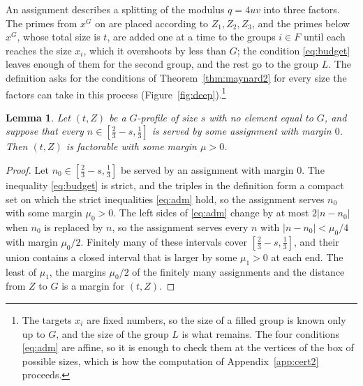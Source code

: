 \documentclass[aps,prd,twocolumn,superscriptaddress,nofootinbib,longbibliography,floatfix,showkeys,nobalancelastpage,amsmath,amssymb,10pt]{revtex4-2}
\theoremstyle{plain}
\newtheorem{lemma}[theorem]{Lemma}
\theoremstyle{definition}
\theoremstyle{plain}
\begin{document}
An assignment describes a splitting of the modulus $q=4uv$ into three factors. The primes from $x^G$ on are placed according to $Z_1,Z_2,Z_3$, and the primes below $x^G$, whose total size is $t$, are added one at a time to the groups $i\in F$ until each reaches the size $x_i$, which it overshoots by less than $G$; the condition \eqref{eq:budget} leaves enough of them for the second group, and the rest go to the group $L$. The definition asks for the conditions of Theorem~\ref{thm:maynard2} for every size the factors can take in this process (Figure~\ref{fig:deep}).\footnote{The targets $x_i$ are fixed numbers, so the size of a filled group is known only up to $G$, and the size of the group $L$ is what remains. The four conditions \eqref{eq:adm} are affine, so it is enough to check them at the vertices of the box of possible sizes, which is how the computation of Appendix~\ref{app:cert2} proceeds.}

\begin{lemma}\label{lem:margin}
Let $(t,Z)$ be a $G$-profile of size $s$ with no element equal to $G$, and suppose that every $n\in[\frac23-s,\frac13]$ is served by some assignment with margin $0$. Then $(t,Z)$ is factorable with some margin $\mu>0$.
\end{lemma}

\begin{proof}
Let $n_0\in[\frac23-s,\frac13]$ be served by an assignment with margin $0$. The inequality \eqref{eq:budget} is strict, and the triples in the definition form a compact set on which the strict inequalities \eqref{eq:adm} hold, so the assignment serves $n_0$ with some margin $\mu_0>0$. The left sides of \eqref{eq:adm} change by at most $2|n-n_0|$ when $n_0$ is replaced by $n$, so the assignment serves every $n$ with $|n-n_0|<\mu_0/4$ with margin $\mu_0/2$. Finitely many of these intervals cover $[\frac23-s,\frac13]$, and their union contains a closed interval that is larger by some $\mu_1>0$ at each end. The least of $\mu_1$, the margins $\mu_0/2$ of the finitely many assignments and the distance from $Z$ to $G$ is a margin for $(t,Z)$.
\end{proof}
\end{document}
